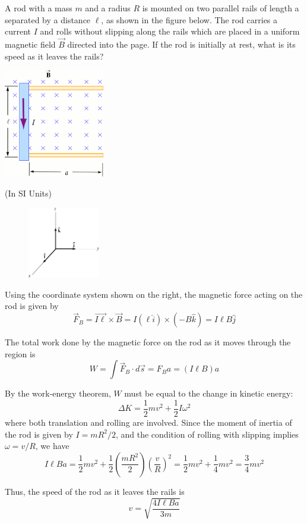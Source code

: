 \documentclass[makesolutionspdf]{esg8022pset}
\begin{document}
\begin{problem}{}
  A rod with a mass $m$ and a radius $R$ is mounted on two parallel rails of length a separated by a distance $\ell$, as shown in the figure below. The rod carries a current $I$ and rolls without slipping along the rails which are placed in a uniform magnetic field $\vec B$ directed into the page. If the rod is initially at rest, what is its speed as it leaves the rails?
  \begin{center}\includegraphics[width=0.33\textwidth]{ps07_03}\end{center}
\end{problem}
\begin{solution}
  (In SI Units)
  
  \begin{figure}
    \centering
    \includegraphics[width=0.28\textwidth]{ps07_sol_03_1}
  \end{figure}
  Using the coordinate system shown on the right, the magnetic force acting on the rod is given by
  $$\vec F_B = \vec{I \ell}\times \vec B = I (\ell \hat i) \times (-B\hat k) = I\ell B \hat j$$
  
  The total work done by the magnetic force on the rod as it moves through the region is
  $$W = \int \vec F_B\cdot d\vec s = F_B a = (I\ell B)a$$
  
  By the work-energy theorem, $W$ must be equal to the change in kinetic energy:
  $$\Delta K = \frac12 m v^2 + \frac12 I \omega^2$$
  where both translation and rolling are involved. Since the moment of inertia of the rod is given by $I = mR^2 / 2$, and the condition of rolling with slipping implies $\omega = v / R$, we have
  $$I \ell B a = \frac12 m v^2 + \frac12 \left(\frac{m R^2}{2}\right)\left(\frac{v}{R}\right)^2 = \frac12 m v^2 + \frac14 m v^2 = \frac34 m v^2$$

  Thus, the speed of the rod as it leaves the rails is
  $$v = \sqrt{\frac{4I\ell B a}{3m}}$$
\end{solution}
\end{document}

